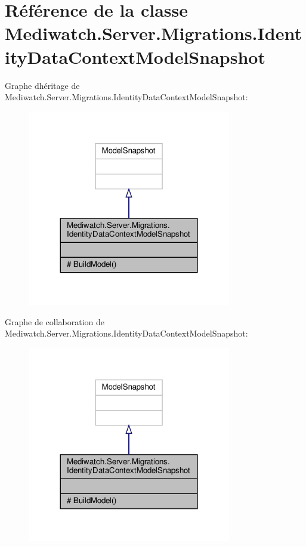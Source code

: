 \hypertarget{class_mediwatch_1_1_server_1_1_migrations_1_1_identity_data_context_model_snapshot}{}\section{Référence de la classe Mediwatch.\+Server.\+Migrations.\+Identity\+Data\+Context\+Model\+Snapshot}
\label{class_mediwatch_1_1_server_1_1_migrations_1_1_identity_data_context_model_snapshot}


Graphe d\textquotesingle{}héritage de Mediwatch.\+Server.\+Migrations.\+Identity\+Data\+Context\+Model\+Snapshot\+:
\nopagebreak
\begin{figure}[H]
\begin{center}
\leavevmode
\includegraphics[width=252pt]{class_mediwatch_1_1_server_1_1_migrations_1_1_identity_data_context_model_snapshot__inherit__graph}
\end{center}
\end{figure}


Graphe de collaboration de Mediwatch.\+Server.\+Migrations.\+Identity\+Data\+Context\+Model\+Snapshot\+:
\nopagebreak
\begin{figure}[H]
\begin{center}
\leavevmode
\includegraphics[width=252pt]{class_mediwatch_1_1_server_1_1_migrations_1_1_identity_data_context_model_snapshot__coll__graph}
\end{center}
\end{figure}

